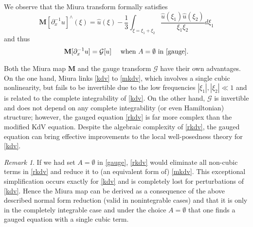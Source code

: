 \documentclass[%
11pt,  reqno]{amsart}
\newcommand{\5}{\textup{V}}
\newcommand{\dx}{\partial_x}
\theoremstyle{remark}
\newtheorem{remark}[theorem]{Remark}
\newcommand{\MMb}{\mathbf{M}}
\newcommand{\Gc}{\mathcal{G}}
\numberwithin{equation}{section}
\numberwithin{theorem}{section}
\begin{document}
		We observe that the Miura transform formally satisfies
		\begin{equation}\label{eq:miura2}
			{\MMb[\partial_x^{-1}u]}^\wedge(\xi) = \widehat{u}(\xi)-\frac{1}{3}\int_{\xi=\xi_1+\xi_2} \frac{\widehat{u}(\xi_1)\widehat{u}(\xi_2)}{\xi_1\xi_2}d\xi_1
		\end{equation}
        and thus
        \begin{equation}
\MMb[\dx^{-1} u]=\Gc[u]\quad \mbox{ when }A=\emptyset\mbox{ in }\eqref{gauge}.
        \end{equation}
        
        Both the Miura map $\MMb$ and the gauge transform $\Gc$ have their own advantages. On the one hand, Miura links \eqref{kdv} to \eqref{mkdv}, which involves a single cubic nonlinearity, but fails to be invertible due to the low frequencies $|\xi_1|, |\xi_2|\ll 1$ and is related to the complete integrability of \eqref{kdv}. On the other hand, $\Gc$ is invertible and does not depend on any complete integrability (or even Hamiltonian) structure; however, the gauged equation \eqref{rkdv} is far more complex than the modified KdV equation. Despite the algebraic complexity of \eqref{rkdv}, the gauged equation can bring effective improvements to the local well-posedness theory for \eqref{kdv}.

        \begin{remark}
If we had set $A=\emptyset$ in \eqref{gauge}, \eqref{rkdv} would eliminate all non-cubic terms in \eqref{rkdv} and reduce it to (an equivalent form of) \eqref{mkdv}. This exceptional simplification occurs exactly for \eqref{kdv} and is completely lost for perturbations of \eqref{kdv}.
		Hence the Miura map can be derived as a consequence of the above described normal form reduction (valid in nonintegrable cases) and that it is only in the completely integrable case and under the choice $A=\emptyset$ that one finds a gauged equation with a single cubic term.
        \end{remark}
\end{document}
